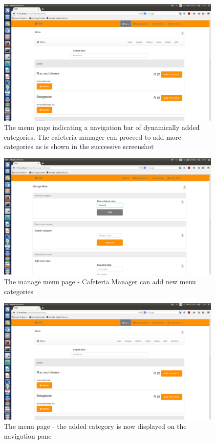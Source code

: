 \documentclass[a4paper,12pt]{report}
\begin{document}
\begin{figure}[H]
  \centering
    \includegraphics[width=1.0\textwidth]{screenshots/beforePasta.png}
    \caption{The menu page indicating a navigation bar of dynamically added categories. The cafeteria manager can proceed to add more categories as is shown in the successive screenshot }
\end{figure}
\begin{figure}[H]
  \centering
    \includegraphics[width=1.0\textwidth]{screenshots/addPasta.png}
    \caption{The manage menu page - Cafeteria Manager can add new menu categories}
\end{figure}
\begin{figure}[H]
  \centering
    \includegraphics[width=1.0\textwidth]{screenshots/afterPasta.png}
    \caption{The menu page - the added category is now displayed on the navigation pane}
\end{figure}
\end{document}
